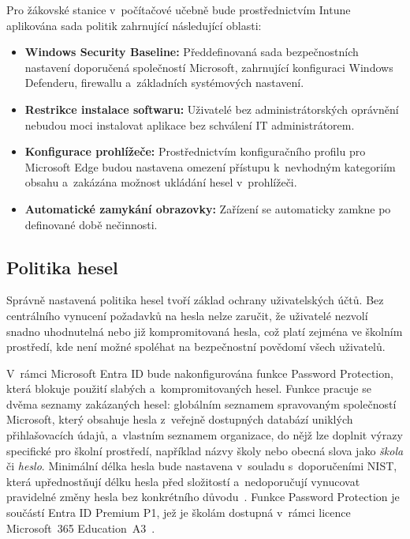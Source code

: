 \documentclass[male,czech,api_bc]{kitheses}
\begin{document}
Pro žákovské stanice v~počítačové učebně bude prostřednictvím Intune 
aplikována sada politik zahrnující následující oblasti:

\begin{itemize}
    \item \textbf{Windows Security Baseline:} Předdefinovaná sada 
    bezpečnostních nastavení doporučená společností Microsoft, zahrnující 
    konfiguraci Windows Defenderu, firewallu a~základních systémových 
    nastavení.
    \item \textbf{Restrikce instalace softwaru:} Uživatelé bez 
    administrátorských oprávnění nebudou moci instalovat aplikace 
    bez schválení IT administrátorem.
    \item \textbf{Konfigurace prohlížeče:} Prostřednictvím 
    konfiguračního profilu pro Microsoft Edge budou nastavena omezení 
    přístupu k~nevhodným kategoriím obsahu a~zakázána možnost ukládání 
    hesel v~prohlížeči.
    \item \textbf{Automatické zamykání obrazovky:} Zařízení se 
    automaticky zamkne po definované době nečinnosti.
\end{itemize}

\subsection{Politika hesel}

Správně nastavená politika hesel tvoří základ ochrany uživatelských účtů. 
Bez centrálního vynucení požadavků na hesla nelze zaručit, že uživatelé 
nezvolí snadno uhodnutelná nebo již kompromitovaná hesla, což platí 
zejména ve školním prostředí, kde není možné spoléhat na bezpečnostní 
povědomí všech uživatelů.

V~rámci Microsoft Entra ID bude nakonfigurována funkce Password Protection, 
která blokuje použití slabých a~kompromitovaných hesel. Funkce pracuje 
se dvěma seznamy zakázaných hesel: globálním seznamem spravovaným 
společností Microsoft, který obsahuje hesla z~veřejně dostupných databází 
uniklých přihlašovacích údajů, a~vlastním seznamem organizace, do nějž 
lze doplnit výrazy specifické pro školní prostředí, například názvy školy 
nebo obecná slova jako \textit{škola} či \textit{heslo}. Minimální délka 
hesla bude nastavena v~souladu s~doporučeními NIST, která upřednostňují 
délku hesla před složitostí a~nedoporučují vynucovat pravidelné změny 
hesla bez konkrétního důvodu~\cite{NIST_SP800634}. Funkce Password 
Protection je součástí Entra ID Premium P1, jež je školám dostupná 
v~rámci licence Microsoft~365 Education~A3~\cite{MicrosoftEntra2025}.
\end{document}
